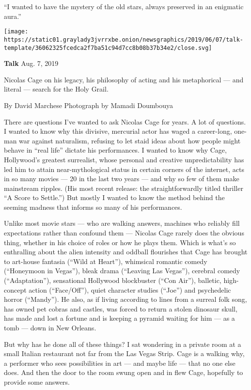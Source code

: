 ``I wanted to have the mystery of the old stars, always preserved in an
enigmatic aura.''

\texttt{[image: https://static01.graylady3jvrrxbe.onion/newsgraphics/2019/06/07/talk-template/36062325fcedca2f7ba51c94d7cc8b08b37b34e2/close.svg]}

\textbf{Talk} Aug. 7, 2019

Nicolas Cage on his legacy, his philosophy of acting and his
metaphorical --- and literal --- search for the Holy Grail.

By David Marchese Photograph by Mamadi Doumbouya

There are questions I've wanted to ask Nicolas Cage for years. A lot of
questions. I wanted to know why this divisive, mercurial actor has waged
a career-long, one-man war against naturalism, refusing to let staid
ideas about how people might behave in ``real life'' dictate his
performances. I wanted to know why Cage, Hollywood's greatest
surrealist, whose personal and creative unpredictability has led him to
attain near-mythological status in certain corners of the internet, acts
in so many movies --- 20 in the last two years --- and why so few of
them make mainstream ripples. (His most recent release: the
straightforwardly titled thriller ``A Score to Settle.'') But mostly I
wanted to know the method behind the seeming madness that informs so
many of his performances.

Unlike most movie stars --- who are walking answers, machines who
reliably fill expectations rather than confound them --- Nicolas Cage
rarely does the obvious thing, whether in his choice of roles or how he
plays them. Which is what's so enthralling about the alien intensity and
oddball flourishes that Cage has brought to art-house fantasia (``Wild
at Heart''), whimsical romantic comedy (``Honeymoon in Vegas''), bleak
drama (``Leaving Las Vegas''), cerebral comedy (``Adaptation''),
sensational Hollywood blockbuster (``Con Air''), balletic, high-concept
action (``Face/Off''), quiet character studies (``Joe'') and psychedelic
horror (``Mandy''). He also, as if living according to lines from a
surreal folk song, has owned pet cobras and castles, was forced to
return a stolen dinosaur skull, has made and lost a fortune and is
keeping a pyramid waiting for him --- as a tomb --- down in New Orleans.

But why has he done all of these things? I sat wondering in a private
room at a small Italian restaurant not far from the Las Vegas Strip.
Cage is a walking why, a performer who sees possibilities in art --- and
maybe life --- that no one else does. And then the door to the room
swung open and in flew Cage, hopefully to provide some answers.

